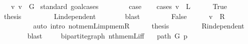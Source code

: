 \begin{isabellebody}
\ \ \ {\isachardoublequoteopen}{\isacharbraceleft}{\kern0pt}v{\isacharcomma}{\kern0pt}\ v{\isacharbraceright}{\kern0pt}\ {\isasymnotin}\ G{\isachardoublequoteclose}\isanewline
%
\isadelimproof
%
\endisadelimproof
%
\isatagproof
{}\isamarkupfalse%
\ {\isacharparenleft}{\kern0pt}standard{\isacharcomma}{\kern0pt}\ goal{\isacharunderscore}{\kern0pt}cases{\isacharparenright}{\kern0pt}\isanewline
\ \ \isamarkupfalse%
\ {}\isanewline
\ \ \isamarkupfalse%
\ {\isacharquery}{\kern0pt}case\isanewline
\ \ \isamarkupfalse%
\ {\isacharparenleft}{\kern0pt}cases\ {\isachardoublequoteopen}v\ {\isasymin}\ L{\isachardoublequoteclose}{\isacharparenright}{\kern0pt}\isanewline
\ \ \ \ \isamarkupfalse%
\ True\isanewline
\ \ \ \ \isamarkupfalse%
\ {\isacharquery}{\kern0pt}thesis\isanewline
\ \ \ \ \ \ \isamarkupfalse%
\ {}\ L{\isacharunderscore}{\kern0pt}independent\isanewline
\ \ \ \ \ \ \isamarkupfalse%
\ blast\isanewline
\ \ \isamarkupfalse%
\isanewline
\ \ \ \ \isamarkupfalse%
\ False\isanewline
\ \ \ \ \isamarkupfalse%
\ {\isachardoublequoteopen}v\ {\isasymin}\ R{\isachardoublequoteclose}\isanewline
\ \ \ \ \ \ \isamarkupfalse%
\ {}\isanewline
\ \ \ \ \ \ \isamarkupfalse%
\ {\isacharparenleft}{\kern0pt}auto\ intro{\isacharcolon}{\kern0pt}\ not{\isacharunderscore}{\kern0pt}mem{\isacharunderscore}{\kern0pt}L{\isacharunderscore}{\kern0pt}imp{\isacharunderscore}{\kern0pt}mem{\isacharunderscore}{\kern0pt}R{\isacharparenright}{\kern0pt}\isanewline
\ \ \ \ \isamarkupfalse%
\ {\isacharquery}{\kern0pt}thesis\isanewline
\ \ \ \ \ \ \isamarkupfalse%
\ {}\ R{\isacharunderscore}{\kern0pt}independent\isanewline
\ \ \ \ \ \ \isamarkupfalse%
\ blast\isanewline
\ \ \isamarkupfalse%
\isanewline
{}\isamarkupfalse%
%
\endisatagproof
{\isafoldproof}%
%
\isadelimproof
\isanewline
%
\endisadelimproof
%
\isadeliminvisible
\isanewline
%
\endisadeliminvisible
%
\isataginvisible
{}\isamarkupfalse%
\ {\isacharparenleft}{\kern0pt}\ bipartite{\isacharunderscore}{\kern0pt}graph{\isacharparenright}{\kern0pt}\ nth{\isacharunderscore}{\kern0pt}mem{\isacharunderscore}{\kern0pt}L{\isacharunderscore}{\kern0pt}iff{\isacharcolon}{\kern0pt}\isanewline
\ \ \ {\isachardoublequoteopen}path\ G\ p{\isachardoublequoteclose}\isanewline

\end{isabellebody}
